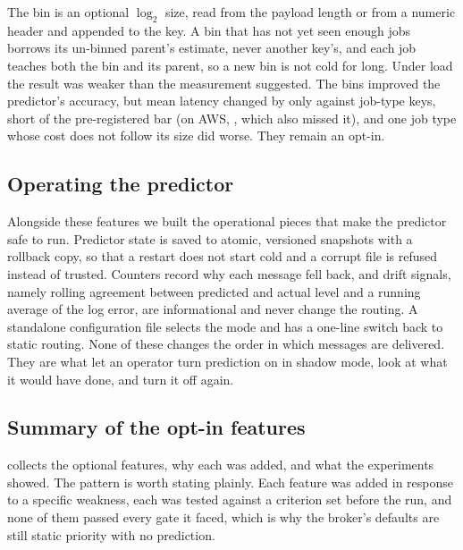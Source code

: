The bin is an optional $\log_2$ size, read from the payload length or from a numeric header and appended to the key. A bin that has not yet seen enough jobs borrows its un-binned parent's estimate, never another key's, and each job teaches both the bin and its parent, so a new bin is not cold for long. Under load the result was weaker than the
measurement suggested. The bins improved the predictor's accuracy, but mean latency changed by only \SizeBinsMeanCI{} against job-type keys, short of the pre-registered bar (on AWS, \SizeBinsAwsMeanCI{}, which also missed it), and one job type whose cost does not follow its size did \SizeBinsInvoiceAbs{} worse. They remain an opt-in.

\subsection{Operating the predictor}\label{sec:ops}

Alongside these features we built the operational pieces that make the predictor safe to run. Predictor state is saved to atomic, versioned snapshots with a rollback copy, so that a restart does not start cold and a corrupt file is refused instead of trusted. Counters record why each message fell back, and drift signals, namely
rolling agreement between predicted and actual level and a running average of the log error, are informational and never change the routing. A standalone configuration file selects the mode and has a one-line switch back to static routing. None of these changes the order in which messages are delivered. They are what let an operator turn
prediction on in shadow mode, look at what it would have done, and turn it off again.

\subsection{Summary of the opt-in features}\label{sec:optin}

 collects the optional features, why each was added, and what the experiments showed. The pattern is worth stating plainly. Each feature was added in response to a specific weakness, each was tested against a criterion set before the run, and none of them passed every gate it faced, which is why the broker's
defaults are still static priority with no prediction.

